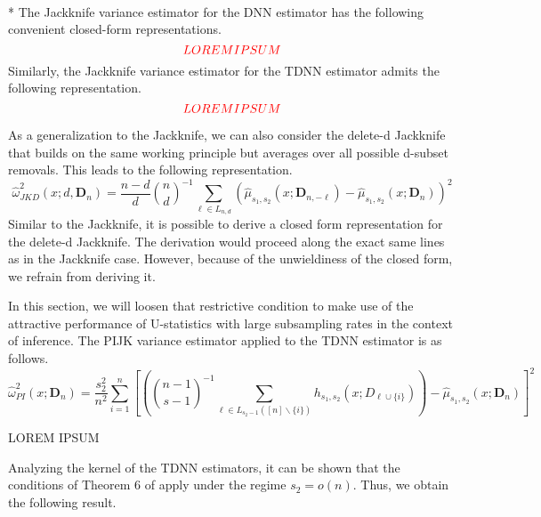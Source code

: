 \begin{boxD}
	\begin{thm}\label{thm:JK_closed_form}\mbox{}\\*
		The Jackknife variance estimator for the DNN estimator has the following convenient closed-form representations.
		\begin{equation}
			{\color{red} LOREM IPSUM}
		\end{equation}
		Similarly, the Jackknife variance estimator for the TDNN estimator admits the following representation.
		\begin{equation}
			{\color{red} LOREM IPSUM}
		\end{equation}
	\end{thm}
\end{boxD}

As a generalization to the Jackknife, we can also consider the delete-d Jackknife that builds on the same working principle but averages over all possible d-subset removals.
This leads to the following representation.
\begin{equation}\label{eq:JKD_Var_Est}
	\hat{\omega}_{JKD}^2\left(x; d, \mathbf{D}_n\right)
	= \frac{n-d}{d}\binom{n}{d}^{-1} \sum_{\ell \in L_{n,d}}
	\left(\hat{\mu}_{s_1, s_2}\left(x; \mathbf{D}_{n, -\ell}\right)
	- \hat{\mu}_{s_1, s_2}\left(x; \mathbf{D}_{n}\right)
	\right)^2
\end{equation}
Similar to the Jackknife, it is possible to derive a closed form representation for the delete-d Jackknife.
The derivation would proceed along the exact same lines as in the Jackknife case.
However, because of the unwieldiness of the closed form, we refrain from deriving it.

In this section, we will loosen that restrictive condition to make use of the attractive performance of U-statistics with large subsampling rates in the context of inference.
The PIJK variance estimator applied to the TDNN estimator is as follows.
\begin{equation}\label{eq:PIJK_Var_Est}
	\hat{\omega}_{PI}^2\left(x; \mathbf{D}_n\right)
	= \frac{s_2^2}{n^2}\sum_{i = 1}^{n}\left[\left(
		\binom{n-1}{s-1}^{-1} \sum_{\ell \in L_{s_2-1}([n]\backslash\{i\})} h_{s_1, s_2}\left(x; D_{\ell \cup \{i\}}\right)\right)
		- \hat{\mu}_{s_1, s_2}\left(x; \mathbf{D}_n\right)\right]^2
\end{equation}

{\color{red} LOREM IPSUM}

Analyzing the kernel of the TDNN estimators, it can be shown that the conditions of Theorem 6 of \citet{peng_bias_2021} apply under the regime $s_2 = o(n)$.
Thus, we obtain the following result.
	
